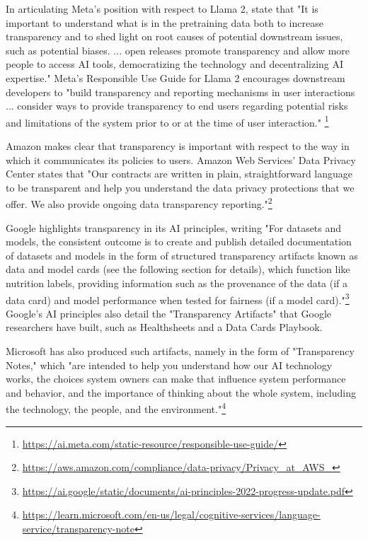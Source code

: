 \documentclass[screen, authorversion, acmsmall]{acmart}
\begin{document}
In articulating Meta's position with respect to Llama 2, \citet{touvron2023llama} state that "It is important to understand what is in the pretraining data both to increase transparency and to shed light on root causes of potential downstream issues, such as potential biases. ... open releases promote transparency and allow more people to access AI tools, democratizing the technology and decentralizing AI expertise." Meta's Responsible Use Guide for Llama 2 encourages downstream developers to "build transparency and reporting mechanisms in user interactions ... consider ways to provide transparency to end users regarding potential risks and limitations of the system prior to or at the time of user interaction."
\footnote{\url{https://ai.meta.com/static-resource/responsible-use-guide/}} 

Amazon makes clear that transparency is important with respect to the way in which it communicates its policies to users.
Amazon Web Services' Data Privacy Center states that "Our contracts are written in plain, straightforward language to be transparent and help you understand the data privacy protections that we offer. We also provide ongoing data transparency reporting."\footnote{\url{https://aws.amazon.com/compliance/data-privacy/Privacy_at_AWS_}} 

Google highlights transparency in its AI principles, writing "For datasets and models, the consistent outcome is to create and publish detailed documentation of datasets and models in the form of structured transparency artifacts known as data and model cards (see the following section for details), which function like nutrition labels, providing information such as the provenance of the data (if a data card) and model performance when tested for fairness (if a model card)."\footnote{\url{https://ai.google/static/documents/ai-principles-2022-progress-update.pdf}} 
Google's AI principles also detail the "Transparency Artifacts" that Google researchers have built, such as Healthsheets and a Data Cards Playbook.

Microsoft has also produced such artifacts, namely in the form of "Transparency Notes," which "are intended to help you understand how our AI technology works, the choices system owners can make that influence system performance and behavior, and the importance of thinking about the whole system, including the technology, the people, and the environment."\footnote{\url{https://learn.microsoft.com/en-us/legal/cognitive-services/language-service/transparency-note}} 
\end{document}
